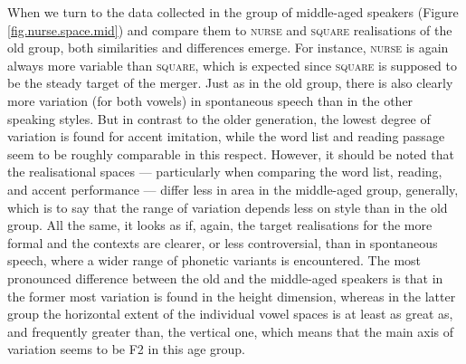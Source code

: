When we turn to the data collected in the group of middle-aged speakers (Figure \ref{fig.nurse.space.mid}) and compare them to \textsc{nurse} and \textsc{square} realisations of the old group, both similarities and differences emerge.
For instance, \textsc{nurse} is again always more variable than \textsc{square}, which is expected since \textsc{square} is supposed to be the steady target of the merger.
Just as in the old group, there is also clearly more variation (for both vowels) in spontaneous speech than in the other speaking styles.
But in contrast to the older generation, the lowest degree of variation is found for accent imitation, while the word list and reading passage seem to be roughly comparable in this respect.
However, it should be noted that the realisational spaces --- particularly when comparing the word list, reading, and accent performance --- differ less in area in the middle-aged group, generally, which is to say that the range of variation depends less on style than in the old group.
All the same, it looks as if, again, the target realisations for the more formal and the  contexts are clearer, or less controversial, than in spontaneous speech, where a wider range of phonetic variants is encountered.
The most pronounced difference between the old and the middle-aged speakers is that in the former most variation is found in the height dimension, whereas in the latter group the horizontal extent of the individual vowel spaces is at least as great as, and frequently greater than, the vertical one, which means that the main axis of variation seems to be F2 in this age group.

